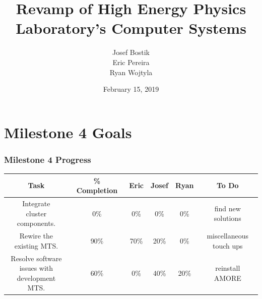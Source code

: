 \documentclass[aspectratio=169]{beamer}
\title[]{Revamp of High Energy Physics Laboratory's Computer Systems}
\author[]{Josef Bostik \\Eric Pereira \\Ryan Wojtyla}
\date{February 15, 2019}
\begin{document}

\begin{frame}
  \titlepage
\end{frame}



\section{Milestone 4 Goals}

\begin{frame}
  
  \frametitle{Milestone 4 Progress}

  \begin{center}
    \begin{tabular}{|c|c|c|c|c|c|}
      \hline
      Task & \% Completion & Eric & Josef & Ryan & To Do \\
      \hline
      \makecell{Integrate \\ cluster \\ components.} & 0\% & 0\% & 0\% & 0\% &
                                                                               \makecell{find
                                                                               new
                                                                               \\
      solutions}
      \\
      \hline
      \makecell{ Rewire the \\ existing MTS.} & 90\% & 70\% & 20\% & 0\% &
                                                            \makecell{miscellaneous \\ touch
                                                            ups} \\
      \hline
      \makecell{Resolve software \\ issues with \\ development MTS.} & 60\% & 0\% & 40\% & 20\% &
                                                                                 reinstall
                                                                                 AMORE
      \\
      \hline
    \end{tabular}
  \end{center}
  
\end{frame}
\end{document}
